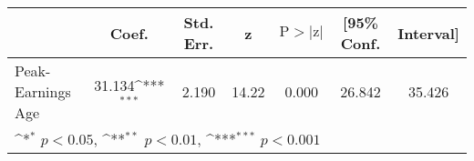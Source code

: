 {
\def\sym#1{\ifmmode^{#1}\else\(^{#1}\)\fi}
\begin{tabular}{l*{1}{cccccc}}
\hline\hline
          &    Coef.         &Std. Err.&        z&$\text{P}>|\text{z}|$&[95\% Conf.&Interval]\\
\hline
Peak-Earnings Age&   31.134\sym{***}&    2.190&    14.22&    0.000&   26.842&   35.426\\
\hline\hline
\multicolumn{7}{l}{\footnotesize \sym{*} \(p<0.05\), \sym{**} \(p<0.01\), \sym{***} \(p<0.001\)}\\
\end{tabular}
}
